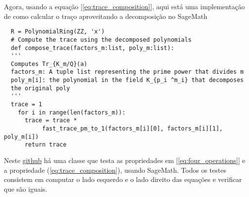 Agora, usando a equação [\ref{eq:trace_composition}], aqui está uma implementação de como calcular o traço aproveitando a decomposição no SageMath

\begin{verbatim}
  R = PolynomialRing(ZZ, 'x')
  # Compute the trace using the decomposed polynomials
  def compose_trace(factors_m:list, poly_m:list):
  '''
  Computes Tr_{K_m/Q}(a) 
  factors_m: A tuple list representing the prime power that divides m
  poly_m[i]: the polynomial in the field K_{p_i ^m_i} that decomposes 
  the original poly 
  '''
  trace = 1
    for i in range(len(factors_m)):
      trace = trace * 
           fast_trace_pm_to_1(factors_m[i][0], factors_m[i][1], poly_m[i])
      return trace
\end{verbatim}

Neste \href{https://github.com/gustavoesteche/ic-bootstraping}{github} há uma classe que testa as propriedades em [\ref{eq:four_operations}] e a propriedade 
(\ref{eq:trace_composition}), usando SageMath. Todos os testes consistem em computar o lado esquerdo e o lado direito das equações e verificar que são iguais.